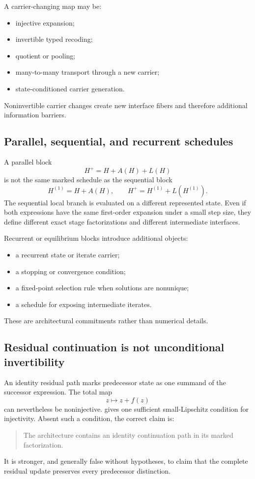 A carrier-changing map may be:
\begin{itemize}
\item injective expansion;
\item invertible typed recoding;
\item quotient or pooling;
\item many-to-many transport through a new carrier;
\item state-conditioned carrier generation.
\end{itemize}
Noninvertible carrier changes create new interface fibers and therefore additional information barriers.

\subsection{Parallel, sequential, and recurrent schedules}

A parallel block
\[
H^+=H+A(H)+L(H)
\]
is not the same marked schedule as the sequential block
\[
H^{(1)}=H+A(H),
\qquad
H^+=H^{(1)}+L(H^{(1)}).
\]
The sequential local branch is evaluated on a different represented state. Even if both expressions have the same first-order expansion under a small step size, they define different exact stage factorizations and different intermediate interfaces.

Recurrent or equilibrium blocks introduce additional objects:
\begin{itemize}
\item a recurrent state or iterate carrier;
\item a stopping or convergence condition;
\item a fixed-point selection rule when solutions are nonunique;
\item a schedule for exposing intermediate iterates.
\end{itemize}
These are architectural commitments rather than numerical details.

\subsection{Residual continuation is not unconditional invertibility}

An identity residual path marks predecessor state as one summand of the successor expression. The total map
\[
z\mapsto z+f(z)
\]
can nevertheless be noninjective.  gives one sufficient small-Lipschitz condition for injectivity. Absent such a condition, the correct claim is:
\begin{quote}
The architecture contains an identity continuation path in its marked factorization.
\end{quote}
It is stronger, and generally false without hypotheses, to claim that the complete residual update preserves every predecessor distinction.

